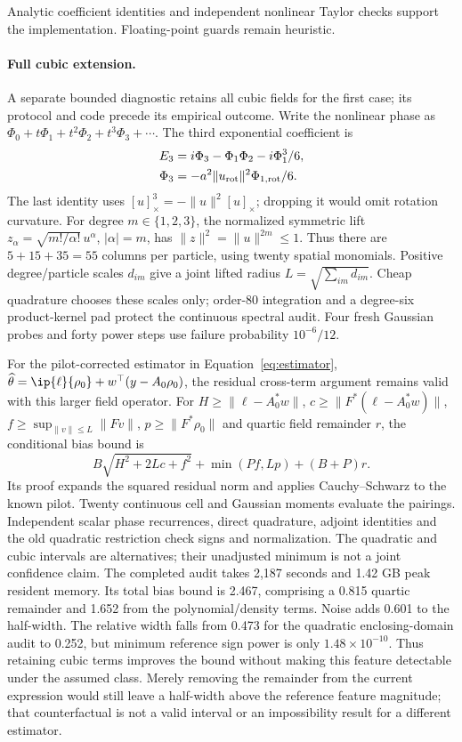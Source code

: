 Analytic coefficient identities and independent nonlinear Taylor checks
support the implementation. Floating-point guards remain heuristic.

\paragraph{Full cubic extension.}
A separate bounded diagnostic retains all cubic fields for the first case;
its protocol and code precede its empirical outcome. Write the nonlinear phase
as $\Phi_0+t\Phi_1+t^2\Phi_2+t^3\Phi_3+\cdots$. The third exponential
coefficient is
\[
\begin{aligned}
 E_3&=i\Phi_3-\Phi_1\Phi_2-i\Phi_1^3/6,\\
 \Phi_3&=-a^2\|u_{\rm rot}\|^2\Phi_{1,\rm rot}/6.
\end{aligned}
\]
The last identity uses $[u]_\times^3=-\|u\|^2[u]_\times$; dropping it would
omit rotation curvature. For degree $m\in\{1,2,3\}$, the normalized symmetric
lift $z_\alpha=\sqrt{m!/\alpha!}\,u^\alpha$, $|\alpha|=m$, has
$\|z\|^2=\|u\|^{2m}\le1$. Thus there are $5+15+35=55$ columns per particle,
using twenty spatial monomials. Positive degree/particle scales $d_{im}$ give
a joint lifted radius $L=\sqrt{\sum_{im}d_{im}}$. Cheap quadrature chooses
these scales only; order-80 integration and a degree-six product-kernel pad
protect the continuous spectral audit. Four fresh Gaussian probes and forty
power steps use failure probability $10^{-6}/12$.

For the pilot-corrected estimator in Equation~\eqref{eq:estimator},
$\widehat\theta=\ip{\ell}{\rho_0}+w^\top(y-A_0\rho_0)$,
the residual cross-term argument remains valid with this larger field operator.
For $H\ge\|\ell-A_0^*w\|$, $c\ge\|F^*(\ell-A_0^*w)\|$,
$f\ge\sup_{\|v\|\le L}\|Fv\|$, $p\ge\|F^*\rho_0\|$ and quartic field
remainder $r$, the conditional bias bound is
\[
 B\sqrt{H^2+2Lc+f^2}+\min(Pf,Lp)+(B+P)r.
\]
Its proof expands the squared residual norm and applies Cauchy--Schwarz to the
known pilot. Twenty continuous cell and Gaussian moments evaluate the pairings.
Independent scalar phase recurrences, direct quadrature, adjoint identities and
the old quadratic restriction check signs and normalization. The quadratic and cubic intervals are alternatives; their unadjusted minimum
is not a joint confidence claim. The completed audit takes 2,187 seconds and 1.42 GB peak resident memory.
Its total bias bound is 2.467, comprising a 0.815 quartic remainder and
1.652 from the polynomial/density terms. Noise adds 0.601 to the half-width.
The relative width falls from 0.473 for the quadratic enclosing-domain audit
to 0.252, but minimum reference sign power is only
$1.48\times10^{-10}$. Thus retaining cubic terms improves the bound without
making this feature detectable under the assumed class. Merely removing the
remainder from the current expression would still leave a half-width above
the reference feature magnitude; that counterfactual is not a valid interval
or an impossibility result for a different estimator.


